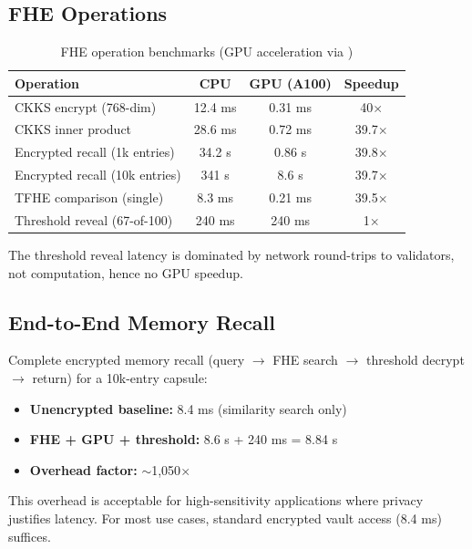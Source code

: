 \subsection{FHE Operations}

\begin{table}[h]
\centering
\begin{tabular}{lccc}
\toprule
\textbf{Operation} & \textbf{CPU} & \textbf{GPU (A100)} & \textbf{Speedup} \\
\midrule
CKKS encrypt (768-dim) & 12.4 ms & 0.31 ms & 40$\times$ \\
CKKS inner product & 28.6 ms & 0.72 ms & 39.7$\times$ \\
Encrypted recall (1k entries) & 34.2 s & 0.86 s & 39.8$\times$ \\
Encrypted recall (10k entries) & 341 s & 8.6 s & 39.7$\times$ \\
TFHE comparison (single) & 8.3 ms & 0.21 ms & 39.5$\times$ \\
Threshold reveal (67-of-100) & 240 ms & 240 ms & 1$\times$ \\
\bottomrule
\end{tabular}
\caption{FHE operation benchmarks (GPU acceleration via \Zoo{} \AChain{})}
\label{tab:fhe_bench}
\end{table}

The threshold reveal latency is dominated by network round-trips to \TChain{} validators, not computation, hence no GPU speedup.

\subsection{End-to-End Memory Recall}

Complete encrypted memory recall (query $\to$ FHE search $\to$ threshold decrypt $\to$ return) for a 10k-entry capsule:

\begin{itemize}
    \item \textbf{Unencrypted baseline:} 8.4 ms (similarity search only)
    \item \textbf{FHE + GPU + threshold:} 8.6 s + 240 ms = 8.84 s
    \item \textbf{Overhead factor:} $\sim$1,050$\times$
\end{itemize}

This overhead is acceptable for high-sensitivity applications where privacy justifies latency. For most use cases, standard encrypted vault access (8.4 ms) suffices.


